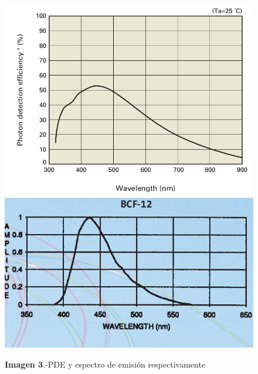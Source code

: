 \documentclass[11pt, a4paper]{article}
\begin{document}
\begin{figure}[htb]
\centering
{
\includegraphics[scale=0.2]{PED.png} 
}
{
\includegraphics[scale=0.25]{EmisionBCF12.png} 
}
\caption{\textbf{Imagen 3}.-PDE y espectro de emisión respectivamente}
\end{figure}

\end{document}
